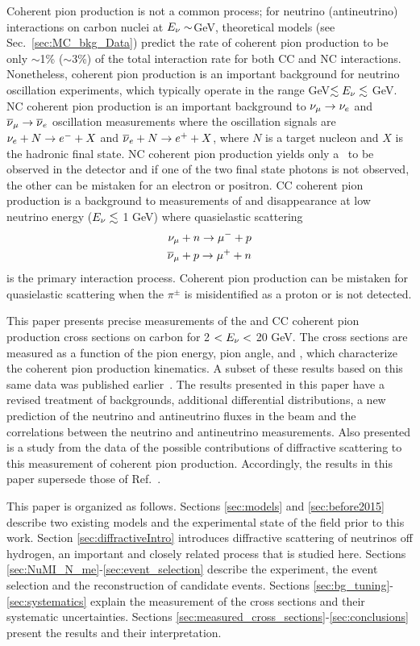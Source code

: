 Coherent pion production is not a common process; for neutrino (antineutrino) interactions on carbon nuclei at
$E_{\nu} \sim$\unit[3]{GeV}, theoretical models (see Sec.~\ref{sec:MC_bkg_Data}) predict the rate of coherent pion production
to be only $\sim$1\% ($\sim$3\%) of the total interaction rate for both CC and NC interactions.  Nonetheless, coherent
pion production is an important background for neutrino oscillation experiments, which typically operate in the range
\unit[1]{GeV}$\lesssim E_{\nu} \lesssim$ \unit[10]{GeV}.  NC coherent pion
production is an important background to $\nu_{\mu}\to\nu_{e}$ and $\overline{\nu}_{\mu}\to\overline{\nu}_{e}$ oscillation measurements where the oscillation
signals are $\nu_{e} + N \to e^{-} + X$ and $\overline{\nu}_{e} + N \to e^{+} + X$,
where $N$ is a target nucleon and $X$ is the hadronic final state.  NC coherent pion production yields only a \pizero\ to be
observed in the detector and if one of the two final state photons is not observed, the other can be mistaken for an electron
or positron.  CC coherent pion production is a background to measurements of \numu and \numubar disappearance at low neutrino
energy ($E_{\nu}\lesssim$ 1 GeV) where quasielastic scattering
\begin{eqnarray}
\nu_{\mu} + n \to \mu^{-} + p \nonumber \\
\overline{\nu}_{\mu} + p \to \mu^{+} + n
\end{eqnarray}
is the primary interaction process.  Coherent pion production can be mistaken for quasielastic scattering when the
$\pi^{\pm}$ is misidentified as a proton or is not detected.

This paper presents precise measurements of the \numu and \numubar CC coherent pion production cross sections on carbon
for 2 $<E_{\nu}<$ 20 GeV.  The cross sections are measured as a function of the pion energy, pion angle, and \qsq, which characterize the
coherent pion production kinematics.  A subset of these results based on this same data was published earlier~\cite{bib:minerva_coh}.
The results presented in this paper have a revised treatment of backgrounds, additional differential distributions, a new prediction of the neutrino and
antineutrino fluxes in the beam and the correlations between the neutrino and antineutrino measurements.  Also presented is a
study from the data of the possible contributions of diffractive scattering to this measurement of coherent pion production.
Accordingly, the results in this paper supersede those of Ref.~\cite{bib:minerva_coh}.

This paper is organized as follows.  Sections \ref{sec:models} and \ref{sec:before2015} describe two existing models and the experimental
state of the field prior to this work.  Section \ref{sec:diffractiveIntro} introduces diffractive scattering of neutrinos off hydrogen,
an important and closely related process that is studied here.  Sections \ref{sec:NuMI_N_me}-\ref{sec:event_selection} describe the experiment,
the event selection and the reconstruction of candidate events.  Sections \ref{sec:bg_tuning}-\ref{sec:systematics} explain the measurement
of the cross sections and their systematic uncertainties.  Sections \ref{sec:measured_cross_sections}-\ref{sec:conclusions} present the
results and their interpretation.


